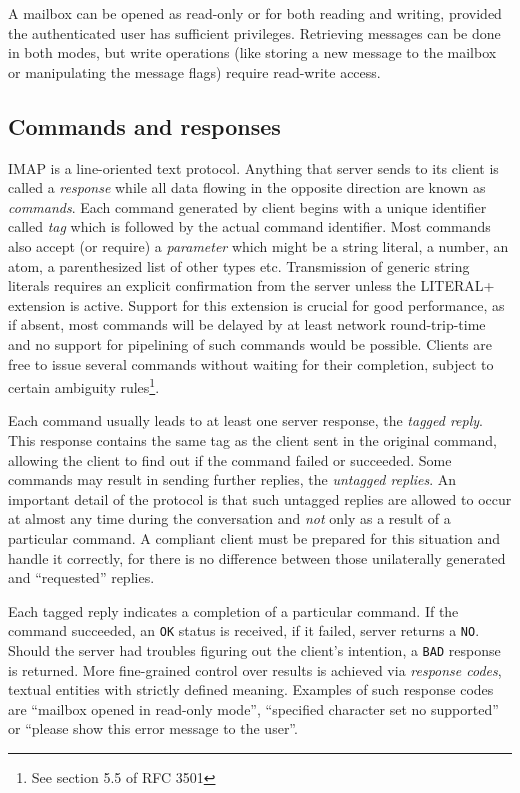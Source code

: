 \documentclass[12pt,notitlepage]{report}
\begin{document}
A mailbox can be opened as read-only or for both reading and writing, provided the
authenticated user has sufficient privileges.  Retrieving messages can be done in
both modes, but write operations (like storing a new message to the mailbox or
manipulating the message flags) require read-write access.

\subsection{Commands and responses}
\label{response-code}

IMAP is a line-oriented text protocol.  Anything that server sends to its client
is called a {\em response} while all data flowing in the opposite direction are
known as {\em commands}.  Each command generated by client begins with a unique
identifier called {\em tag} which is followed by the actual command identifier.
Most commands also accept (or require) a {\em parameter} which might be a string
literal, a number, an atom, a parenthesized list of other types etc.
Transmission of generic string literals requires an explicit confirmation from
the server unless the LITERAL+ \cite{rfc-literalplus} extension is active.
Support for this extension is crucial for good performance, as if absent, most
commands will be delayed by at least network round-trip-time and no support for
pipelining of such commands would be possible.  Clients are free to issue several
commands without waiting for their completion, subject to certain ambiguity
rules\footnote{See section 5.5 of RFC 3501}.

Each command usually leads to at least one server response, the {\em tagged
reply}.  This response contains the same tag as the client sent in the original
command, allowing the client to find out if the command failed or succeeded.
Some commands may result in sending further replies, the {\em untagged replies}.
An important detail of the protocol is that such untagged replies are allowed to
occur at almost any time during the conversation and {\em not} only as a result
of a particular command.  A compliant client must be prepared for this situation
and handle it correctly, for there is no difference between those unilaterally
generated and ``requested'' replies.

Each tagged reply indicates a completion of a particular command.  If the
command succeeded, an {\tt OK} status is received, if it failed, server returns
a {\tt NO}.  Should the server had troubles figuring out the client's intention,
a {\tt BAD} response is returned.  More fine-grained control over results is
achieved via {\em response codes}, textual entities with strictly defined
meaning.  Examples of such response codes are ``mailbox opened in read-only
mode'', ``specified character set no supported'' or ``please show this error
message to the user''.
\end{document}
